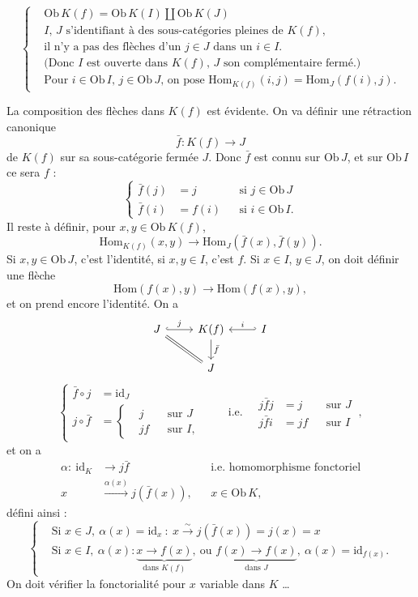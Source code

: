 \documentclass[11pt]{article}
\newcommand{\printedpage}[1]{\marginpar{\footnotesize p.~#1}}
\newcommand{\msp}[1]{\marginpar{\footnotesize [#1]}}
\newcommand{\Hom}{\mathrm{Hom}}
\newcommand{\Ob}{\mathrm{Ob}\,}
\newcommand{\id}{\mathrm{id}}
\begin{document}
\[
\left\{
\begin{aligned}
&\Ob K(f) = \Ob K(I) \amalg \Ob K(J) \qquad \\
&\text{$I$, $J$ s'identifiant à des sous-catégories pleines de $K(f)$,}\\
&\text{il n'y a pas des flèches d'un $j \in J$ dans un $i \in I$.}\\
&\text{(Donc $I$ est ouverte dans $K(f)$, $J$ son complémentaire fermé.)}\\
&\text{Pour $i \in \Ob I$, $j \in \Ob J$, on pose $\Hom_{K(f)}(i,j) = \Hom_J(f(i),j)$.}
\end{aligned}
\right.
\]

La composition des flèches dans $K(f)$ est évidente. On va définir une rétraction canonique
\[ \bar{f} : K(f) \longrightarrow J \]
de $K(f)$ sur sa sous-catégorie fermée $J$. Donc $\bar{f}$ est connu sur $\Ob J$, et sur $\Ob I$ ce sera $f$ :
\[
\left\{
\begin{aligned}
\bar{f}(j) &= j && \text{si } j \in \Ob J\\
\bar{f}(i) &= f(i) && \text{si } i \in \Ob I.
\end{aligned}
\right.
\]
Il reste à définir, pour $x, y \in \Ob K(f)$,
\msp{page 80}
\[ \Hom_{K(f)}(x,y) \longrightarrow \Hom_J(\bar{f}(x), \bar{f}(y)). \]
Si $x, y \in \Ob J$, c'est l'identité, si $x, y \in I$, c'est $f$. Si $x \in I$, $y \in J$, on doit définir une flèche
\[ \Hom(f(x),y) \longrightarrow \Hom(f(x),y), \]
et on prend encore l'identité. On a
\[
\begin{tikzcd}
J \arrow[r, hook, "j"] \arrow[dr, equal] & K(f) \arrow[d, "\bar{f}"] & I \arrow[l, hook', "i"'] \\
& J &
\end{tikzcd}
\]
\[
\left\{
\begin{aligned}
\bar{f} \circ j &= \id_J\\
j \circ \bar{f} &= \left\{
\begin{aligned}
&j && \text{sur } J\\
&jf && \text{sur } I,
\end{aligned}
\right.
\end{aligned}
\right.
\qquad \text{i.e.} \quad
\boxed{
\begin{aligned}
j\bar{f}j &= j && \text{sur } J\\
j\bar{f}i &= jf && \text{sur } I
\end{aligned}
}\ ,
\]
et on a
\[
\begin{aligned}
\alpha :\ \id_K &\longrightarrow j\bar{f} && \text{i.e. homomorphisme fonctoriel}\\
x &\xrightarrow{\alpha(x)} j(\bar{f}(x)), && x \in \Ob K,
\end{aligned}
\]
\printedpage{6}
défini ainsi :
\[
\left\{
\begin{aligned}
&\text{Si } x \in J,\ \alpha(x) = \id_x\ :\ x \xrightarrow{\sim} j(\bar{f}(x)) = j(x) = x\\
&\text{Si } x \in I,\ \alpha(x) : \underbrace{x \longrightarrow f(x)}_{\text{dans } K(f)},\ \text{ou } \underbrace{f(x) \longrightarrow f(x)}_{\text{dans } J},\ \alpha(x) = \id_{f(x)}.
\end{aligned}
\right.
\]
On doit vérifier la fonctorialité pour $x$ variable dans $K$ \dots
\end{document}
